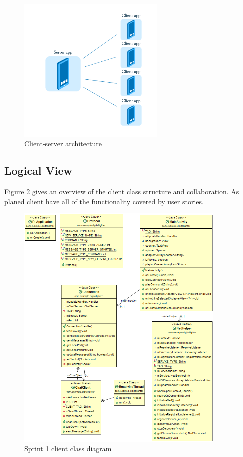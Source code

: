 \begin{figure}[H]
	\centering
		\includegraphics[width=7cm]{sprint1/arhitecture.png}
	\caption{Client-server architecture}
	\label{fig:sprint1_arhitecture}
\end{figure}

\subsection{Logical View}
Figure \ref{fig:class_diagram_client} gives an overview of the client class structure and collaboration. As planed client have all of the functionality covered by user stories. 

\begin{figure}[H]
	\centering
		\includegraphics[width=10cm]{sprint1/class_diagram_client.png}
	\caption{Sprint 1 client class diagram}
	\label{fig:class_diagram_client}
\end{figure}

